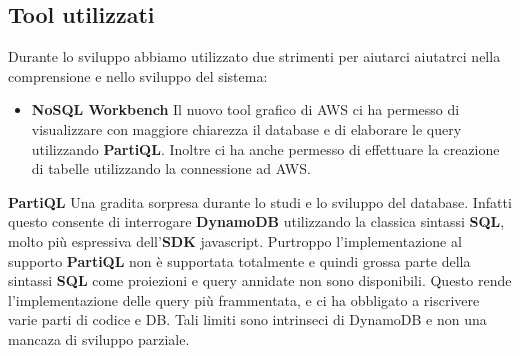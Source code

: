 \subsection{Tool utilizzati}
    Durante lo sviluppo abbiamo utilizzato due strimenti per aiutarci aiutatrci nella comprensione e nello sviluppo del sistema:
    \begin{itemize}
        \item \textbf{NoSQL Workbench} Il nuovo tool grafico di AWS ci ha permesso di visualizzare con maggiore chiarezza il database e di elaborare le query utilizzando \textbf{PartiQL}.
        Inoltre ci ha anche permesso di effettuare la creazione di tabelle utilizzando la connessione ad AWS.
    \end{itemize}\textbf{PartiQL} Una gradita sorpresa durante lo studi e lo sviluppo del database. Infatti questo consente di interrogare \textbf{DynamoDB} utilizzando la classica sintassi \textbf{SQL}, molto più espressiva dell'\textbf{SDK} javascript.
    Purtroppo l'implementazione al supporto \textbf{PartiQL} non è supportata totalmente e quindi grossa parte della sintassi \textbf{SQL}
    come proiezioni e query annidate non sono disponibili.
    Questo rende l'implementazione delle query più frammentata, e ci ha obbligato a riscrivere varie parti di codice e DB.
    Tali limiti sono intrinseci di DynamoDB e non una mancaza di sviluppo parziale.




